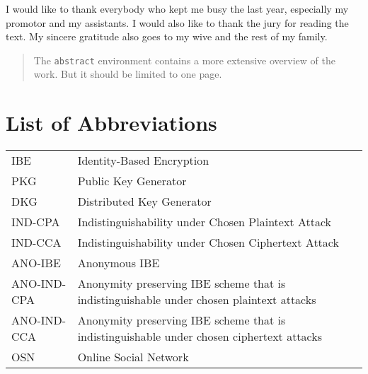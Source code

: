 \documentclass[master=eelt,masteroption=em]{kulemt}
\theoremstyle{plain}
\theoremstyle{definition}
\begin{document}
\begin{preface}
  I would like to thank everybody who kept me busy the last year,
  especially my promotor and my assistants. I would also like to thank the
  jury for reading the text. My sincere gratitude also goes to my wive and
  the rest of my family.
\end{preface}

\tableofcontents*

\begin{abstract}
  The \texttt{abstract} environment contains a more extensive overview of
  the work. But it should be limited to one page.

  \lipsum[1]
\end{abstract}

\listoffiguresandtables
\chapter{List of Abbreviations}
\begin{flushleft}
  \renewcommand{\arraystretch}{1.1}
  \begin{tabularx}{\textwidth}{@{}p{30mm}X@{}}
    IBE   & Identity-Based Encryption \\
    PKG   & Public Key Generator \\
    DKG   & Distributed Key Generator \\
    IND-CPA  & Indistinguishability under Chosen Plaintext Attack  \\
    IND-CCA & Indistinguishability under Chosen Ciphertext Attack \\
    ANO-IBE & Anonymous IBE \\
    ANO-IND-CPA & Anonymity preserving IBE scheme that is indistinguishable under chosen plaintext attacks \\
    ANO-IND-CCA & Anonymity preserving IBE scheme that is indistinguishable under chosen ciphertext attacks \\ 
    OSN & Online Social Network \\
  \end{tabularx}
\end{flushleft}
\end{document}
